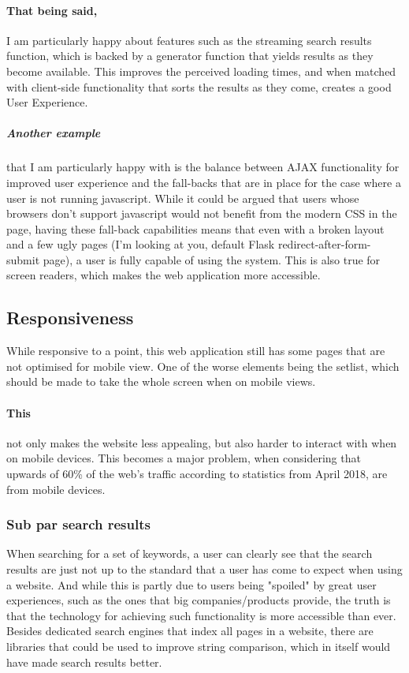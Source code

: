 \documentclass[10pt, a4paper]{article}
\begin{document}
	\paragraph{That being said,} I am particularly happy about features such as the streaming search results function, which is backed by a generator function that yields results as they become available. This improves the perceived loading times, and when matched with client-side functionality that sorts the results as they come, creates a good User Experience.
	\subparagraph{Another example} that I am particularly happy with is the balance between AJAX functionality for improved user experience and the fall-backs that are in place for the case where a user is not running javascript. While it could be argued that users whose browsers don't support javascript would not benefit from the modern CSS in the page, having these fall-back capabilities means that even with a broken layout and a few ugly pages (I'm looking at you, default Flask redirect-after-form-submit page), a user is fully capable of using the system. This is also true for screen readers, which makes the web application more accessible.
	
	\subsection{Responsiveness}
	While responsive to a point, this web application still has some pages that are not optimised for mobile view.
	One of the worse elements being the setlist, which should be made to take the whole screen when on mobile views.
	\paragraph{This} not only makes the website less appealing, but also harder to interact with when on mobile devices. This becomes a major problem, when considering that upwards of 60\% of the web's traffic according to statistics from April 2018, are from mobile devices\cite{Enge_2018}.
	
	\subsubsection{Sub par search results}
	When searching for a set of keywords, a user can clearly see that the search results are just not up to the standard that a user has come to expect when using a website. And while this is partly due to users being "spoiled" by great user experiences, such as the ones that big companies/products provide, the truth is that the technology for achieving such functionality is more accessible than ever. Besides dedicated search engines that index all pages in a website, there are libraries that could be used to improve string comparison, which in itself would have made search results better.
\end{document}
